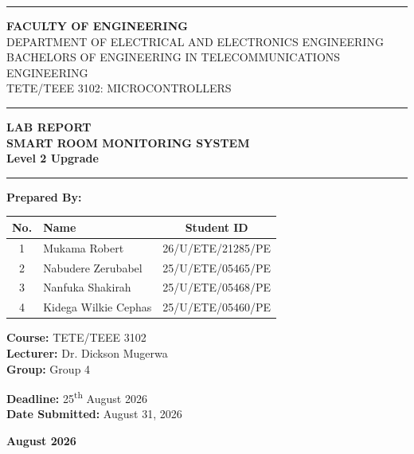\documentclass[12pt,a4paper]{article}
\begin{document}
\begin{titlepage}
    \centering
    
    \rule{3cm}{3cm} %
    \vspace{1cm}
    
    {\Large \textbf{FACULTY OF ENGINEERING}}\\[0.2cm]
    {\large DEPARTMENT OF ELECTRICAL AND ELECTRONICS ENGINEERING}\\[0.2cm]
    {\large BACHELORS OF ENGINEERING IN TELECOMMUNICATIONS ENGINEERING}\\[0.5cm]
    
    {\large TETE/TEEE 3102: MICROCONTROLLERS}\\[1cm]
    
    \hrule
    \vspace{0.5cm}
    {\huge \textbf{LAB REPORT}}\\[0.3cm]
    {\LARGE \textbf{SMART ROOM MONITORING SYSTEM}}\\[0.2cm]
    {\Large \textbf{Level 2 Upgrade}}
    \vspace{0.5cm}
    \hrule
    \vspace{1.5cm}
    
    {\Large \textbf{Prepared By:}}
    \vspace{0.5cm}
    
    \begin{center}
        \renewcommand{\arraystretch}{1.2}
        \begin{tabular}{|c|l|c|}
            \hline
            \textbf{No.} & \textbf{Name} & \textbf{Student ID} \\
            \hline
            1 & Mukama Robert & 26/U/ETE/21285/PE \\
            2 & Nabudere Zerubabel & 25/U/ETE/05465/PE \\
            3 & Nanfuka Shakirah & 25/U/ETE/05468/PE \\
            4 & Kidega Wilkie Cephas & 25/U/ETE/05460/PE \\
            \hline
        \end{tabular}
    \end{center}
    
    \vfill
    
    \begin{flushleft}
        \textbf{Course:} TETE/TEEE 3102 \\
        \textbf{Lecturer:} Dr. Dickson Mugerwa \\
        \textbf{Group:} Group 4
    \end{flushleft}
    
    \vspace{-1.5cm}
    \begin{flushright}
        \textbf{Deadline:} 25\textsuperscript{th} August 2026 \\
        \textbf{Date Submitted:} August 31, 2026
    \end{flushright}
    
    \vspace{1cm}
    {\large \textbf{August 2026}}
\end{titlepage}
\end{document}
